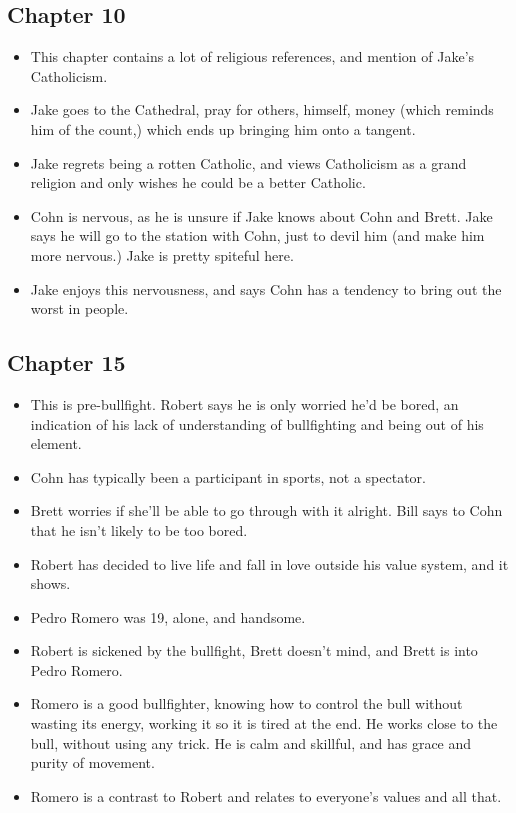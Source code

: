 \documentclass[11pt]{article}
\begin{document}
\subsection{Chapter 10}
\begin{itemize}
	\item This chapter contains a lot of religious references, and mention of
		Jake's Catholicism.
	\item Jake goes to the Cathedral, pray for others, himself, money (which
		reminds him of the count,) which ends up bringing him onto a tangent.
	\item Jake regrets being a rotten Catholic, and views Catholicism as a grand
		religion and only wishes he could be a better Catholic.
	\item Cohn is nervous, as he is unsure if Jake knows about Cohn and Brett.
		Jake says he will go to the station with Cohn, just to devil him (and 
		make him more nervous.)  Jake is pretty spiteful here.
	\item Jake enjoys this nervousness, and says Cohn has a tendency to bring
		out the worst in people.
\end{itemize}
\subsection{Chapter 15}
\begin{itemize}
	\item This is pre-bullfight.  Robert says he is only worried he'd be bored,
		an indication of his lack of understanding of bullfighting and being out
		of his element.
	\item Cohn has typically been a participant in sports, not a spectator.
	\item Brett worries if she'll be able to go through with it alright.  Bill
		says to Cohn that he isn't likely to be too bored.
	\item Robert has decided to live life and fall in love outside his value
		system, and it shows.
	\item Pedro Romero was 19, alone, and handsome.  
	\item Robert is sickened by the bullfight, Brett doesn't mind, and Brett
		is into Pedro Romero.
	\item Romero is a good bullfighter, knowing how to control the bull without
		wasting its energy, working it so it is tired at the end.  He works close
		to the bull, without using any trick.  He is calm and skillful, and has
		grace and purity of movement.
	\item Romero is a contrast to Robert and relates to everyone's values and
		all that.
\end{itemize}
\end{document}
